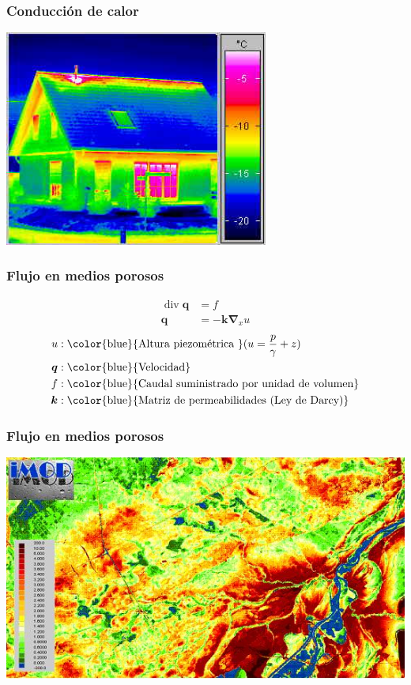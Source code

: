 \documentclass[handout]{beamer}
\begin{document}
\begin{frame}
\frametitle{Conducción de calor}
\begin{center}
\includegraphics[width=0.65\textwidth]{building_envelope_ir.jpg}
\end{center}
\end{frame}
\begin{frame}
\frametitle{Flujo en medios porosos}
\begin{align*}
\operatorname{div} \bm{q}&=f  \\
\bm{q}&=-\bm{k} \bm{\nabla}_{x} u
\end{align*}
\begin{align*}
u  &:\textrm{\color{blue}{Altura piezométrica }} (u=\frac{p}{\gamma}+z) \\
\bm{q}&:\textrm{\color{blue}{Velocidad}}\\
f&:\textrm{\color{blue}{Caudal suministrado por unidad de volumen}}\\
\bm{k}&:\textrm{\color{blue}{Matriz de permeabilidades (Ley de Darcy)}}
\end{align*}
\end{frame}
\begin{frame}
\frametitle{Flujo en medios porosos}
\begin{center}
\includegraphics[width=\textwidth]{Deltares_IMOD.jpg}
\end{center}
\end{frame}
\end{document}
